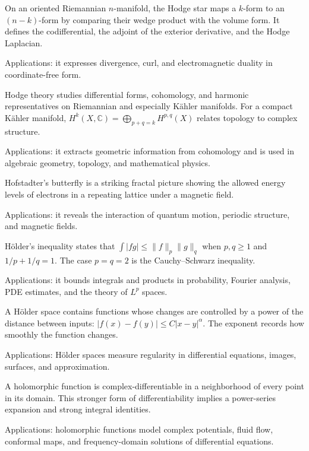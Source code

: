 On an oriented Riemannian $n$-manifold, the Hodge star maps a $k$-form to an $(n-k)$-form by comparing their wedge product with the volume form. It defines the codifferential, the adjoint of the exterior derivative, and the Hodge Laplacian. \par\noindent Applications: it expresses divergence, curl, and electromagnetic duality in coordinate-free form.

Hodge theory studies differential forms, cohomology, and harmonic representatives on Riemannian and especially Kähler manifolds. For a compact Kähler manifold, $H^k(X,\mathbb C)=\bigoplus_{p+q=k}H^{p,q}(X)$ relates topology to complex structure. \par\noindent Applications: it extracts geometric information from cohomology and is used in algebraic geometry, topology, and mathematical physics.

Hofstadter's butterfly is a striking fractal picture showing the allowed energy levels of electrons in a repeating lattice under a magnetic field. \par\noindent Applications: it reveals the interaction of quantum motion, periodic structure, and magnetic fields.

Hölder's inequality states that $\int|fg|\leq\|f\|_p\|g\|_q$ when $p,q\geq1$ and $1/p+1/q=1$. The case $p=q=2$ is the Cauchy--Schwarz inequality. \par\noindent Applications: it bounds integrals and products in probability, Fourier analysis, PDE estimates, and the theory of $L^p$ spaces.

A Hölder space contains functions whose changes are controlled by a power of the distance between inputs: $|f(x)-f(y)|\leq C|x-y|^\alpha$. The exponent records how smoothly the function changes. \par\noindent Applications: Hölder spaces measure regularity in differential equations, images, surfaces, and approximation.

A holomorphic function is complex-differentiable in a neighborhood of every point in its domain. This stronger form of differentiability implies a power-series expansion and strong integral identities. \par\noindent Applications: holomorphic functions model complex potentials, fluid flow, conformal maps, and frequency-domain solutions of differential equations.

